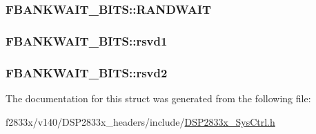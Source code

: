 \subsubsection[{R\+A\+N\+D\+W\+A\+I\+T}]{ F\+B\+A\+N\+K\+W\+A\+I\+T\+\_\+\+B\+I\+T\+S\+::\+R\+A\+N\+D\+W\+A\+I\+T}\label{struct_f_b_a_n_k_w_a_i_t___b_i_t_s_a51e4f58ff980ecf2107b921d8511c5bb}
\hypertarget{struct_f_b_a_n_k_w_a_i_t___b_i_t_s_a0e349785deb6785684dc6171b0c01873}{}
\subsubsection[{rsvd1}]{ F\+B\+A\+N\+K\+W\+A\+I\+T\+\_\+\+B\+I\+T\+S\+::rsvd1}\label{struct_f_b_a_n_k_w_a_i_t___b_i_t_s_a0e349785deb6785684dc6171b0c01873}
\hypertarget{struct_f_b_a_n_k_w_a_i_t___b_i_t_s_a4c11f6983334381618df77caee206ecf}{}
\subsubsection[{rsvd2}]{ F\+B\+A\+N\+K\+W\+A\+I\+T\+\_\+\+B\+I\+T\+S\+::rsvd2}\label{struct_f_b_a_n_k_w_a_i_t___b_i_t_s_a4c11f6983334381618df77caee206ecf}


The documentation for this struct was generated from the following file\+:\begin{DoxyCompactItemize}
\item 
f2833x/v140/\+D\+S\+P2833x\+\_\+headers/include/\hyperlink{_d_s_p2833x___sys_ctrl_8h}{D\+S\+P2833x\+\_\+\+Sys\+Ctrl.\+h}\end{DoxyCompactItemize}

